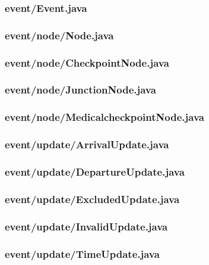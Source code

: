 \documentclass[a4paper, twoside]{article}
\begin{document}
\subsubsection{event/Event.java}

\subsubsection{event/node/Node.java}

\subsubsection{event/node/CheckpointNode.java}

\subsubsection{event/node/JunctionNode.java}

\subsubsection{event/node/MedicalcheckpointNode.java}

\subsubsection{event/update/ArrivalUpdate.java}

\subsubsection{event/update/DepartureUpdate.java}

\subsubsection{event/update/ExcludedUpdate.java}

\subsubsection{event/update/InvalidUpdate.java}

\subsubsection{event/update/TimeUpdate.java}

\end{document}
